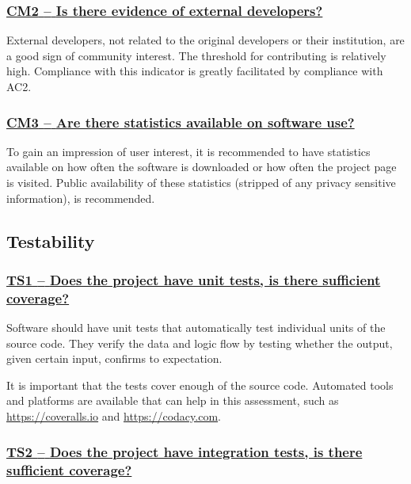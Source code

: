 \documentclass[a4paper,11pt]{article}
\newcommand{\indicator}[1]{\subsubsection*{\underline{#1}}}
\begin{document}
\newcommand{\cmTwoName}{CM2}
\newcommand{\cmTwoID}{\cmTwoName}
\newcommand{\cmTwoText}{Is there evidence of external developers?}
\indicator{\cmTwoName{ }--{ }\cmTwoText}\label{id:cm2} 

External developers, not related to the original developers or their
institution, are a good sign of community interest. The threshold for
contributing is relatively high. Compliance with this indicator is greatly
facilitated by compliance with AC2.

\newcommand{\cmThreeName}{CM3}
\newcommand{\cmThreeID}{\cmThreeName}
\newcommand{\cmThreeText}{Are there statistics available on software use?}
\indicator{\cmThreeName{ }--{ }\cmThreeText}\label{id:cm3} 

To gain an impression of user interest, it is recommended to have statistics
available on how often the software is downloaded or how often the project page
is visited. Public availability of these statistics (stripped of any privacy
sensitive information), is recommended.

\subsection{Testability}\label{sec:tes}

\newcommand{\tsOneName}{TS1}
\newcommand{\tsOneID}{\tsOneName}
\newcommand{\tsOneText}{Does the project have unit tests, is there sufficient coverage?}
\indicator{\tsOneName{ }--{ }\tsOneText}\label{id:ts1} 

Software should have unit tests that automatically test individual units of the
source code. They verify the data and logic flow by testing whether the output,
given certain input, confirms to expectation.

It is important that the tests cover enough of the source code. Automated tools
and platforms are available that can help in this assessment, such as
\url{https://coveralls.io} and \url{https://codacy.com}.

\newcommand{\tsTwoName}{TS2}
\newcommand{\tsTwoID}{\tsTwoName}
\newcommand{\tsTwoText}{Does the project have integration tests, is there sufficient coverage?}
\indicator{\tsTwoName{ }--{ }\tsTwoText}\label{id:ts2} 
\end{document}
